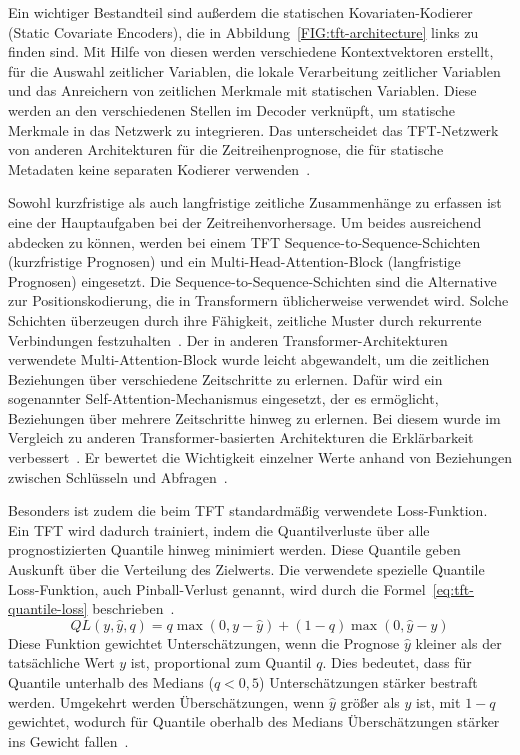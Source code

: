 Ein wichtiger Bestandteil sind außerdem die statischen Kovariaten-Kodierer (Static Covariate Encoders), die in Abbildung~\ref{FIG:tft-architecture} links zu finden sind.
Mit Hilfe von diesen werden verschiedene Kontextvektoren erstellt, für die Auswahl zeitlicher Variablen, die lokale Verarbeitung zeitlicher Variablen und das Anreichern von zeitlichen Merkmale mit statischen Variablen.
Diese werden an den verschiedenen Stellen im Decoder verknüpft, um statische Merkmale in das Netzwerk zu integrieren.
Das unterscheidet das \ac{TFT}-Netzwerk von anderen Architekturen für die Zeitreihenprognose, die für statische Metadaten keine separaten Kodierer verwenden~\cite{Lim.19.12.2019, Labiadh.2023}.

Sowohl kurzfristige als auch langfristige zeitliche Zusammenhänge zu erfassen ist eine der Hauptaufgaben bei der Zeitreihenvorhersage.
Um beides ausreichend abdecken zu können, werden bei einem \ac{TFT} Sequence-to-Sequence-Schichten (kurzfristige Prognosen) und ein Multi-Head-Attention-Block (langfristige Prognosen) eingesetzt.
Die Sequence-to-Sequence-Schichten sind die Alternative zur Positionskodierung, die in Transformern üblicherweise verwendet wird.
Solche Schichten überzeugen durch ihre Fähigkeit, zeitliche Muster durch rekurrente Verbindungen festzuhalten~\cite{Labiadh.2023}.
Der in anderen Transformer-Architekturen verwendete Multi-Attention-Block wurde leicht abgewandelt, um die zeitlichen Beziehungen über verschiedene Zeitschritte zu erlernen.
Dafür wird ein sogenannter Self-Attention-Mechanismus eingesetzt, der es ermöglicht, Beziehungen über mehrere Zeitschritte hinweg zu erlernen.
Bei diesem wurde im Vergleich zu anderen Transformer-basierten Architekturen die Erklärbarkeit verbessert~\cite{Lim.19.12.2019}.
Er bewertet die Wichtigkeit einzelner Werte anhand von Beziehungen zwischen Schlüsseln und Abfragen~\cite{Labiadh.2023}.

Besonders ist zudem die beim \ac{TFT} standardmäßig verwendete Loss-Funktion.
Ein \ac{TFT} wird dadurch trainiert, indem die Quantilverluste über alle prognostizierten Quantile hinweg minimiert werden.
Diese Quantile geben Auskunft über die Verteilung des Zielwerts.
Die verwendete spezielle Quantile Loss-Funktion, auch Pinball-Verlust genannt, wird durch die Formel~\ref{eq:tft-quantile-loss} beschrieben~\cite{Labiadh.2023}.
\begin{equation}
 \label{eq:tft-quantile-loss}
 QL(y, \hat{y}, q) = q \max(0, y - \hat{y}) + (1 - q) \max(0, \hat{y} - y)
\end{equation}
Diese Funktion gewichtet Unterschätzungen, wenn die Prognose $\hat{y}$ kleiner als der tatsächliche Wert $y$ ist, proportional zum Quantil $q$.
Dies bedeutet, dass für Quantile unterhalb des Medians ($q < 0,5$) Unterschätzungen stärker bestraft werden.
Umgekehrt werden Überschätzungen, wenn $\hat{y}$ größer als $y$ ist, mit $1 - q$ gewichtet, wodurch für Quantile oberhalb des Medians Überschätzungen stärker ins Gewicht fallen~\cite{Efimov.29.10.2023}.

